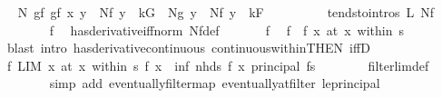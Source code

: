 \begin{isabellebody}
\ \isamarkupfalse%
\ {\isachardoublequoteopen}{\isacharquery}{\kern0pt}N\ {\isacharquery}{\kern0pt}gf\ {\isacharquery}{\kern0pt}gf{\isacharprime}{\kern0pt}\ x\ y\ {\isasymle}\ Nf\ y\ {\isacharasterisk}{\kern0pt}\ kG\ {\isacharplus}{\kern0pt}\ Ng\ y\ {\isacharasterisk}{\kern0pt}\ {\isacharparenleft}{\kern0pt}Nf\ y\ {\isacharplus}{\kern0pt}\ kF{\isacharparenright}{\kern0pt}{\isachardoublequoteclose}\ \isacommand{{\isachardot}{\kern0pt}}\isamarkupfalse%
\isanewline
\ \ \isamarkupfalse%
\isanewline
\ \ \ \ \isamarkupfalse%
\ {\isacharbrackleft}{\kern0pt}tendsto{\isacharunderscore}{\kern0pt}intros{\isacharbrackright}{\kern0pt}{\isacharcolon}{\kern0pt}\ {\isachardoublequoteopen}{\isacharquery}{\kern0pt}L\ Nf{\isachardoublequoteclose}\isanewline
\ \ \ \ \ \ \isamarkupfalse%
\ f\ \isamarkupfalse%
\ has{\isacharunderscore}{\kern0pt}derivative{\isacharunderscore}{\kern0pt}iff{\isacharunderscore}{\kern0pt}norm\ Nf{\isacharunderscore}{\kern0pt}def\ \isacommand{{\isachardot}{\kern0pt}{\isachardot}{\kern0pt}}\isamarkupfalse%
\isanewline
\ \ \ \ \isamarkupfalse%
\ f\ \isamarkupfalse%
\ {\isachardoublequoteopen}{\isacharparenleft}{\kern0pt}f\ {\isasymlonglongrightarrow}\ f\ x{\isacharparenright}{\kern0pt}\ {\isacharparenleft}{\kern0pt}at\ x\ within\ s{\isacharparenright}{\kern0pt}{\isachardoublequoteclose}\isanewline
\ \ \ \ \ \ \isamarkupfalse%
\ {\isacharparenleft}{\kern0pt}blast\ intro{\isacharcolon}{\kern0pt}\ has{\isacharunderscore}{\kern0pt}derivative{\isacharunderscore}{\kern0pt}continuous\ continuous{\isacharunderscore}{\kern0pt}within{\isacharbrackleft}{\kern0pt}THEN\ iffD{}{\isacharbrackright}{\kern0pt}{\isacharparenright}{\kern0pt}\isanewline
\ \ \ \ \isamarkupfalse%
\ \isamarkupfalse%
\ f{\isacharprime}{\kern0pt}{\isacharcolon}{\kern0pt}\ {\isachardoublequoteopen}LIM\ x\ at\ x\ within\ s{\isachardot}{\kern0pt}\ f\ x\ {\isacharcolon}{\kern0pt}{\isachargreater}{\kern0pt}\ inf\ {\isacharparenleft}{\kern0pt}nhds\ {\isacharparenleft}{\kern0pt}f\ x{\isacharparenright}{\kern0pt}{\isacharparenright}{\kern0pt}\ {\isacharparenleft}{\kern0pt}principal\ {\isacharparenleft}{\kern0pt}f{\isacharbackquote}{\kern0pt}s{\isacharparenright}{\kern0pt}{\isacharparenright}{\kern0pt}{\isachardoublequoteclose}\isanewline
\ \ \ \ \ \ \isamarkupfalse%
\ filterlim{\isacharunderscore}{\kern0pt}def\isanewline
\ \ \ \ \ \ \isamarkupfalse%
\ {\isacharparenleft}{\kern0pt}simp\ add{\isacharcolon}{\kern0pt}\ eventually{\isacharunderscore}{\kern0pt}filtermap\ eventually{\isacharunderscore}{\kern0pt}at{\isacharunderscore}{\kern0pt}filter\ le{\isacharunderscore}{\kern0pt}principal{\isacharparenright}{\kern0pt}\isanewline

\end{isabellebody}
